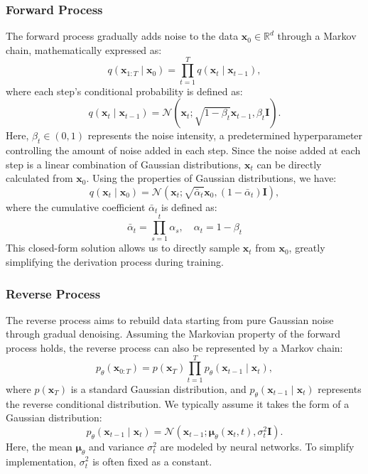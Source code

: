 \documentclass[
reprint,
superscriptaddress,
nofootinbib,
amsmath,amssymb,
aps,
prd,
]{revtex4-2}
\begin{document}
\subsubsection{Forward Process}
The forward process gradually adds noise to the data $\mathbf{x}_0 \in \mathbb{R}^d$ through a Markov chain, mathematically expressed as:
\begin{equation}
    q(\mathbf{x}_{1:T} \mid \mathbf{x}_0) = \prod_{t=1}^T q(\mathbf{x}_t \mid \mathbf{x}_{t-1}),
\end{equation}
where each step's conditional probability is defined as:
\begin{equation}
    q(\mathbf{x}_t \mid \mathbf{x}_{t-1}) = \mathcal{N}(\mathbf{x}_t; \sqrt{1 - \beta_t} \mathbf{x}_{t-1}, \beta_t \mathbf{I}).
\end{equation}
Here, $\beta_t \in (0, 1)$ represents the noise intensity, a predetermined hyperparameter controlling the amount of noise added in each step.
Since the noise added at each step is a linear combination of Gaussian distributions, $\mathbf{x}_t$ can be directly calculated from $\mathbf{x}_0$. Using the properties of Gaussian distributions, we have:
\begin{equation}
    q(\mathbf{x}_t \mid \mathbf{x}_0) = \mathcal{N}(\mathbf{x}_t; \sqrt{\bar{\alpha}_t} \mathbf{x}_0, (1 - \bar{\alpha}_t) \mathbf{I}),
\end{equation}
where the cumulative coefficient $\bar{\alpha}_t$ is defined as:
\begin{equation}
    \bar{\alpha}_t = \prod_{s=1}^t \alpha_s, \quad \alpha_t = 1 - \beta_t
\end{equation}
This closed-form solution allows us to directly sample $\mathbf{x}_t$ from $\mathbf{x}_0$, greatly simplifying the derivation process during training.

\subsubsection{Reverse Process}
The reverse process aims to rebuild data starting from pure Gaussian noise through gradual denoising. Assuming the Markovian property of the forward process holds, the reverse process can also be represented by a Markov chain:
\begin{equation}
    p_\theta(\mathbf{x}_{0:T}) = p(\mathbf{x}_T) \prod_{t=1}^T p_\theta(\mathbf{x}_{t-1} \mid \mathbf{x}_t),
\end{equation}
where $p(\mathbf{x}_T)$ is a standard Gaussian distribution, and $p_\theta(\mathbf{x}_{t-1} \mid \mathbf{x}_t)$ represents the reverse conditional distribution. We typically assume it takes the form of a Gaussian distribution:
\begin{equation}
    p_\theta(\mathbf{x}_{t-1} \mid \mathbf{x}_t) = \mathcal{N}(\mathbf{x}_{t-1}; \boldsymbol{\mu}_\theta(\mathbf{x}_t, t), \sigma_t^2 \mathbf{I}).
\end{equation}
Here, the mean $\boldsymbol{\mu}_\theta$ and variance $\sigma_t^2$ are modeled by neural networks. To simplify implementation, $\sigma_t^2$ is often fixed as a constant.
\end{document}
